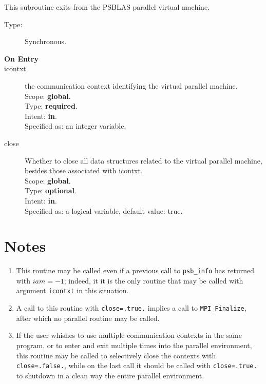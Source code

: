 

This subroutine exits from the  PSBLAS parallel virtual  machine.
\begin{description}
\item[Type:] Synchronous.
\item[\bf  On Entry ]
\item[icontxt] the communication context identifying the virtual
  parallel machine.\\
Scope: {\bf global}.\\
Type: {\bf required}.\\
Intent: {\bf in}.\\
Specified as: an integer variable.
\item[close] Whether to close all data structures related to the
  virtual parallel machine, besides those associated with icontxt.\\
Scope: {\bf global}.\\
Type: {\bf optional}.\\
Intent: {\bf in}.\\
Specified as: a logical  variable, default value: true.
\end{description}

\section*{Notes}
\begin{enumerate}
\item This routine may be called even if a previous call to
  \verb|psb_info| has returned with $iam=-1$; indeed, it it is the only
  routine that may be called with argument \verb|icontxt| in this
  situation.
\item A call to this routine with \verb|close=.true.| implies a call
  to \verb|MPI_Finalize|, after which no parallel routine may be called.
\item If the user whishes to use multiple communication contexts in the
  same program, or to enter and exit multiple times into the parallel
  environment, this routine may be called to 
  selectively close the contexts with \verb|close=.false.|, while on
  the last call it should be called with \verb|close=.true.| to
  shutdown in a clean way the entire parallel environment.
\end{enumerate}


